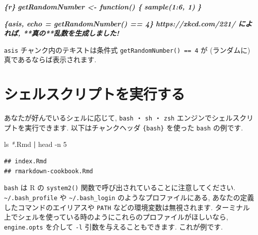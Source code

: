 \documentclass[
  11pt,
  lualatex,
  ja=standard]{bxjsreport}
\newenvironment{Shaded}{\begin{snugshade}}{\end{snugshade}}
\newcommand{\AttributeTok}[1]{\textcolor[rgb]{0.77,0.63,0.00}{#1}}
\newcommand{\FunctionTok}[1]{\textcolor[rgb]{0.00,0.00,0.00}{#1}}
\newcommand{\InformationTok}[1]{\textcolor[rgb]{0.56,0.35,0.01}{\textbf{\textit{#1}}}}
\newcommand{\KeywordTok}[1]{\textcolor[rgb]{0.13,0.29,0.53}{\textbf{#1}}}
\newcommand{\NormalTok}[1]{#1}
\newcommand{\PreprocessorTok}[1]{\textcolor[rgb]{0.56,0.35,0.01}{\textit{#1}}}
\begin{document}
\begin{Shaded}
\begin{Highlighting}[]
\InformationTok{\textasciigrave{}\textasciigrave{}\textasciigrave{}\{r\}}
\InformationTok{getRandomNumber \textless{}{-} function() \{}
\InformationTok{  sample(1:6, 1)}
\InformationTok{\}}
\InformationTok{\textasciigrave{}\textasciigrave{}\textasciigrave{}}

\InformationTok{\textasciigrave{}\textasciigrave{}\textasciigrave{}\{asis, echo = getRandomNumber() == 4\}}
\InformationTok{https://xkcd.com/221/ によれば, **真の**乱数を生成しました!}
\InformationTok{\textasciigrave{}\textasciigrave{}\textasciigrave{}}
\end{Highlighting}
\end{Shaded}

\texttt{asis} チャンク内のテキストは条件式 \texttt{getRandomNumber() == 4} が (ランダムに) 真であるならば表示されます.

\hypertarget{eng-bash}{%
\section{シェルスクリプトを実行する}\label{eng-bash}}

あなたが好んでいるシェルに応じて, \texttt{bash} ・ \texttt{sh} ・ \texttt{zsh} エンジンでシェルスクリプトを実行できます. 以下はチャンクヘッダ \texttt{\textasciigrave{}\textasciigrave{}\textasciigrave{}\{bash\}} を使った \texttt{bash} の例です.

\begin{Shaded}
\begin{Highlighting}[numbers=left,,]
\FunctionTok{ls} \PreprocessorTok{*}\NormalTok{.Rmd }\KeywordTok{|} \FunctionTok{head} \AttributeTok{{-}n}\NormalTok{ 5}
\end{Highlighting}
\end{Shaded}

\begin{verbatim}
## index.Rmd
## rmarkdown-cookbook.Rmd
\end{verbatim}

\texttt{bash} は R の \texttt{system2()} 関数で呼び出されていることに注意してください. \texttt{\textasciitilde{}/.bash\_profile} や \texttt{\textasciitilde{}/.bash\_login} のようなプロファイルにある, あなたの定義したコマンドのエイリアスや \texttt{PATH} などの環境変数は無視されます. ターミナル上でシェルを使っている時のようにこれらのプロファイルがほしいなら, \texttt{engine.opts} を介して \texttt{-l} 引数を与えることもできます. これが例です.
\end{document}
